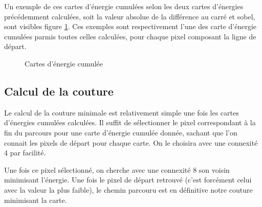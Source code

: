 \documentclass[a4paper]{article}
\begin{document}
Un exemple de ces cartes d'énergie cumulées selon les deux cartes d'énergies précédemment calculées, soit la
valeur absolue de la différence au carré et sobel, sont visibles figure \ref{ecum}. Ces exemples sont
respectivement l'une des carte d'énergie cumulées parmis toutes celles calculées, pour chaque pixel composant la ligne de départ.

\begin{figure}[!ht]%
    \centering
    \hspace{0.030\textwidth}
    \caption{Cartes d'énergie cumulée}
    \label{ecum}
\end{figure}

\subsection{Calcul de la couture}

Le calcul de la couture minimale est relativement simple une fois les cartes d'énergies cumulées calculées. 
Il suffit de sélectionner le pixel correspondant à la fin du parcours pour une carte d'énergie cumulée donnée,
sachant que l'on connait les pixels de départ pour chaque carte. On le choisira avec une connexité 4 par
facilité.

Une fois ce pixel sélectionné, on cherche avec une connexité 8 son voisin minimisant l'énergie.
Une fois le pixel de départ retrouvé (c'est forcément celui avec la valeur la plus faible), le chemin
parcouru est en définitive notre couture minimisant la carte.
\end{document}
